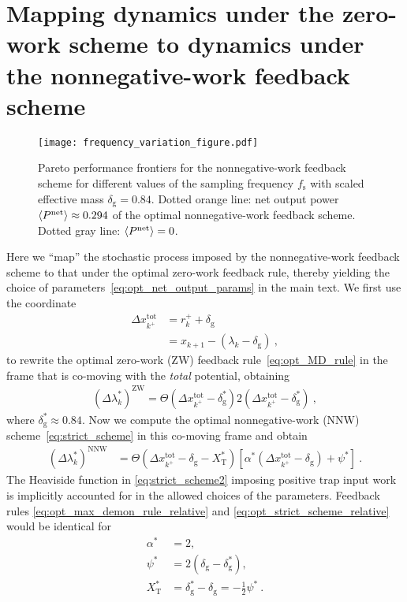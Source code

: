 \documentclass[%
reprint,
bibnotes, amsmath, amssymb, aps, pre,
 showkeys,
floatfix
]{revtex4-2}
\newcommand{\mrm}{\mathrm}
\newcommand{\pr}[1]{\left(#1\right)} %
\newcommand{\sr}[1]{\left[#1\right]} %
\newcommand{\dg}{\delta_{\mrm{g}}}
\newcommand{\fs}{f_{\mrm{s}}}
\newcommand{\dlk}{\Delta\lambda_{k}}
\newcommand{\xkp}{x_{k+1}}
\newcommand{\lk}{\lambda_{k}}
\newcommand{\xkpr}{r_{k}^{+}}
\newcommand{\xkprt}{\Delta x_{k^{+}}^{\mrm{tot}}}
\newcommand{\epn}{\ev{P^{\mrm{net}}}}
\newcommand{\xT}{X_{\mrm{T}}}
\begin{document}
\section{Mapping dynamics under the zero-work scheme to dynamics under the nonnegative-work feedback scheme}
\label{sec:mapping}

\begin{figure}[!htbp]
    \centering 
    \texttt{[image: frequency\_variation\_figure.pdf]}
    \caption{Pareto performance frontiers for the nonnegative-work feedback scheme for different values of the sampling frequency $\fs$ with scaled effective mass $\dg = 0.84$.
    Dotted orange line: net output power $\epn\approx 0.294$ of the optimal nonnegative-work feedback scheme.
    Dotted gray line: $\epn = 0$.
    }
    \label{fig:sampling_freq_var}
\end{figure}

Here we ``map'' the stochastic process imposed by the nonnegative-work feedback scheme to that under the optimal zero-work feedback rule, thereby yielding the choice of parameters~\eqref{eq:opt_net_output_params} in the main text.
We first use the coordinate
\begin{subequations}
    \begin{align}
        \xkprt &= \xkpr + \dg \\
        &= \xkp-\pr{\lk-\dg}\ , 
    \end{align}
\end{subequations}
to rewrite the optimal zero-work (ZW) feedback rule~\eqref{eq:opt_MD_rule} in the frame that is co-moving with the \emph{total} potential, obtaining
\begin{align}
    \pr{\dlk^{*}}^{\mrm{ZW}} = \Theta\pr{\xkprt-\dg^{*}}2\pr{\xkprt-\dg^{*}}\ ,\label{eq:opt_max_demon_rule_relative}
\end{align}
where $\dg^{*} \approx 0.84$. 
Now we compute the optimal nonnegative-work (NNW) scheme~\eqref{eq:strict_scheme} in this co-moving frame and obtain
\begin{align}
    \pr{\dlk^{*}}^{\mrm{NNW}} &= \Theta\pr{\xkprt-\dg-\xT^{*}}\sr{\alpha^*\pr{\xkprt-\dg}+\psi^{*}}\ . \label{eq:opt_strict_scheme_relative}
\end{align}
The Heaviside function in \eqref{eq:strict_scheme2} imposing positive trap input work is implicitly accounted for in the allowed choices of the parameters.
Feedback rules \eqref{eq:opt_max_demon_rule_relative} and \eqref{eq:opt_strict_scheme_relative} would be identical for
\begin{subequations}\label{eq:strict_to_MD_rule_map}
    \begin{align}
        \alpha^{*} &= 2,\\
        \psi^{*} &= 2\pr{\dg-\dg^{*}},\\
        \xT^{*} &= \dg^{*}-\dg = -\frac{1}{2}\psi^{*}\ .
    \end{align}
\end{subequations}
\end{document}
